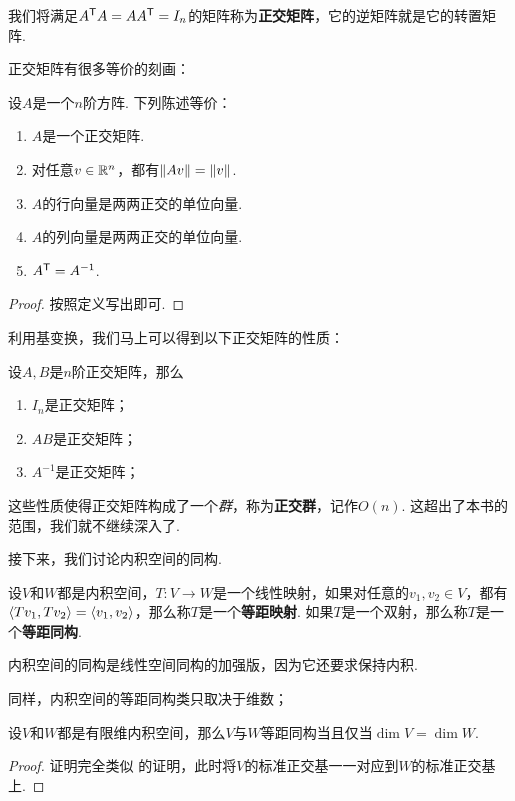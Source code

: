 我们将满足$A^{\mathsf{T}} A=AA^{\mathsf{T}}=I_n$的矩阵称为\textbf{正交矩阵}，它的逆矩阵就是它的转置矩阵. 

正交矩阵有很多等价的刻画：

\begin{theorem}\label{thm:orthogonal-matrix}
设$A$是一个$n$阶方阵. 下列陈述等价：
\begin{enumerate}
    \item $A$是一个正交矩阵.
    \item 对任意$v\in\mathbb{R}^n$，都有$\left\|Av\right\|=\left\|v\right\|$. 
    \item $A$的行向量是两两正交的单位向量.
    \item $A$的列向量是两两正交的单位向量.
    \item $A^{\mathsf{T}}=A^{-1}$.
\end{enumerate}
\end{theorem}
\begin{proof}
    按照定义写出即可. 
\end{proof}

利用基变换，我们马上可以得到以下正交矩阵的性质：

\begin{proposition}\label{prop:orthogonal-matrix-property}
设$A,B$是$n$阶正交矩阵，那么
\begin{enumerate}
    \item $I_n$是正交矩阵；
    \item $AB$是正交矩阵；
    \item $A^{-1}$是正交矩阵；
\end{enumerate}
\end{proposition}

这些性质使得正交矩阵构成了一个\emph{群}，称为\textbf{正交群}，记作$O(n)$. 这超出了本书的范围，我们就不继续深入了.


接下来，我们讨论内积空间的同构. 

\begin{definition}[等距映射与等距同构]\label{def:isometry}
设$V$和$W$都是内积空间，$T:V\to W$是一个线性映射，如果对任意的$v_1,v_2\in V$，都有$\left\langle{Tv_1},{Tv_2}\right\rangle=\left\langle{v_1},{v_2}\right\rangle$，那么称$T$是一个\textbf{等距映射}. 如果$T$是一个双射，那么称$T$是一个\textbf{等距同构}.
\end{definition}

内积空间的同构是线性空间同构的加强版，因为它还要求保持内积.

同样，内积空间的等距同构类只取决于维数；

\begin{theorem}\label{thm:isometry}
设$V$和$W$都是有限维内积空间，那么$V$与$W$等距同构当且仅当$\dim V=\dim W$. 
\end{theorem}
\begin{proof}
    证明完全类似 的证明，此时将$V$的标准正交基一一对应到$W$的标准正交基上.
\end{proof}

